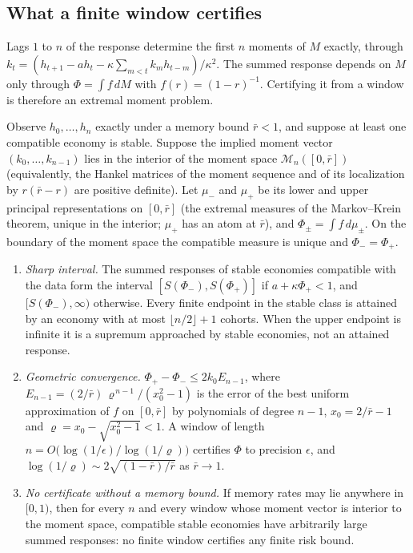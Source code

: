 \subsection{What a finite window certifies}

Lags $1$ to $n$ of the response determine the first $n$ moments of $M$ exactly, through $k_t=(h_{t+1}-ah_t-\kappa\sum_{m<t}k_mh_{t-m})/\kappa^2$. The summed response depends on $M$ only through $\Phi=\int f\,dM$ with $f(r)=(1-r)^{-1}$. Certifying it from a window is therefore an extremal moment problem.

\begin{theorem}\label{thm:window}
Observe $h_0,\ldots,h_n$ exactly under a memory bound $\bar r<1$, and suppose at least one compatible economy is stable. Suppose the implied moment vector $(k_0,\ldots,k_{n-1})$ lies in the interior of the moment space $\mathcal M_n([0,\bar r])$ (equivalently, the Hankel matrices of the moment sequence and of its localization by $r(\bar r-r)$ are positive definite). Let $\mu_-$ and $\mu_+$ be its lower and upper principal representations on $[0,\bar r]$ (the extremal measures of the Markov--Krein theorem, unique in the interior; $\mu_+$ has an atom at $\bar r$), and $\Phi_\pm=\int f\,d\mu_\pm$. On the boundary of the moment space the compatible measure is unique and $\Phi_-=\Phi_+$.
\begin{enumerate}[label=(\roman*)]
\item \emph{Sharp interval.} The summed responses of stable economies compatible with the data form the interval $[S(\Phi_-),S(\Phi_+)]$ if $a+\kappa\Phi_+<1$, and $[S(\Phi_-),\infty)$ otherwise. Every finite endpoint in the stable class is attained by an economy with at most $\lfloor n/2\rfloor+1$ cohorts. When the upper endpoint is infinite it is a supremum approached by stable economies, not an attained response.
\item \emph{Geometric convergence.} $\Phi_+-\Phi_-\le2k_0E_{n-1}$, where $E_{n-1}=(2/\bar r)\,\varrho^{\,n-1}/(x_0^2-1)$ is the error of the best uniform approximation of $f$ on $[0,\bar r]$ by polynomials of degree $n-1$, $x_0=2/\bar r-1$ and $\varrho=x_0-\sqrt{x_0^2-1}<1$. A window of length $n=O\bigl(\log(1/\epsilon)/\log(1/\varrho)\bigr)$ certifies $\Phi$ to precision $\epsilon$, and $\log(1/\varrho)\sim2\sqrt{(1-\bar r)/\bar r}$ as $\bar r\to1$.
\item \emph{No certificate without a memory bound.} If memory rates may lie anywhere in $[0,1)$, then for every $n$ and every window whose moment vector is interior to the moment space, compatible stable economies have arbitrarily large summed responses: no finite window certifies any finite risk bound.
\end{enumerate}
\end{theorem}

